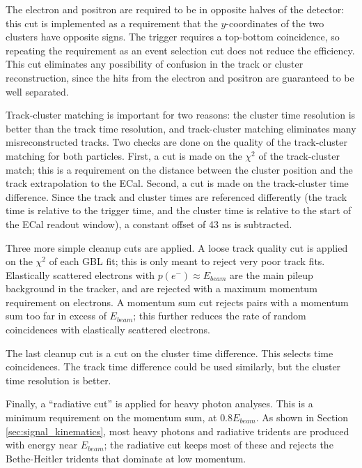 The electron and positron are required to be in opposite halves of the detector: this cut is implemented as a requirement that the $y$-coordinates of the two clusters have opposite signs.
The trigger requires a top-bottom coincidence, so repeating the requirement as an event selection cut does not reduce the efficiency.
This cut eliminates any possibility of confusion in the track or cluster reconstruction, since the hits from the electron and positron are guaranteed to be well separated.

Track-cluster matching is important for two reasons: the cluster time resolution is better than the track time resolution, and track-cluster matching eliminates many misreconstructed tracks.
Two checks are done on the quality of the track-cluster matching for both particles.
First, a cut is made on the $\chi^2$ of the track-cluster match; this is a requirement on the distance between the cluster position and the track extrapolation to the ECal.
Second, a cut is made on the track-cluster time difference.
Since the track and cluster times are referenced differently (the track time is relative to the trigger time, and the cluster time is relative to the start of the ECal readout window), a constant offset of 43 ns is subtracted.

Three more simple cleanup cuts are applied.
A loose track quality cut is applied on the $\chi^2$ of each GBL fit; this is only meant to reject very poor track fits.
Elastically scattered electrons with $p(e^-)\approx E_{beam}$ are the main pileup background in the tracker, and are rejected with a maximum momentum requirement on electrons.
A momentum sum cut rejects pairs with a momentum sum too far in excess of $E_{beam}$; this further reduces the rate of random coincidences with elastically scattered electrons.

The last cleanup cut is a cut on the cluster time difference.
This selects time coincidences.
The track time difference could be used similarly, but the cluster time resolution is better.

Finally, a ``radiative cut'' is applied for heavy photon analyses.
This is a minimum requirement on the momentum sum, at $0.8E_{beam}$.
As shown in Section \ref{sec:signal_kinematics}, most heavy photons and radiative tridents are produced with energy near $E_{beam}$; the radiative cut keeps most of these and rejects the Bethe-Heitler tridents that dominate at low momentum.

